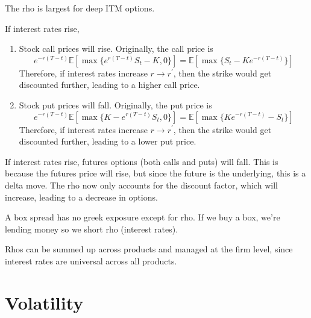 \documentclass{article}
\begin{document}
    The rho is largest for deep ITM options.

    \begin{theorem}
      \label{thm:rho-positions-on-stock-options}
      If interest rates rise,
      \begin{enumerate}
        \item Stock call prices will rise. Originally, the call price is
        \begin{equation}
          e^{-r (T - t)} \mathbb{E}[\max\{e^{r(T - t)} S_t - K, 0\}] = \mathbb{E}[\max\{ S_t - K e^{-r (T - t)}\}]
        \end{equation}
        Therefore, if interest rates increase $r \rightarrow r^\prime$, then the strike would get discounted further, leading to a higher call price.

        \item Stock put prices will fall. Originally, the put price is
        \begin{equation}
          e^{-r (T - t)} \mathbb{E}[\max\{K - e^{r(T - t)} S_t, 0\}] = \mathbb{E}[\max\{K e^{-r (T - t)} - S_t\}]
        \end{equation}
        Therefore, if interest rates increase $r \rightarrow r^\prime$, then the strike would get discounted further, leading to a lower put price.
      \end{enumerate}
    \end{theorem}

    \begin{theorem}
      \label{thm:rho-positions-on-futures-options}
      If interest rates rise, futures options (both calls and puts) will fall. This is because the futures price will rise, but since the future is the underlying, this is a delta move. The rho now only accounts for the discount factor, which will increase, leading to a decrease in options.
    \end{theorem}

    \begin{example}
      \label{ex:box-spread}
      A box spread has no greek exposure except for rho. If we buy a box, we're lending money so we short rho (interest rates).
    \end{example}

    Rhos can be summed up across products and managed at the firm level, since interest rates are universal across all products.

\section{Volatility}
\end{document}
